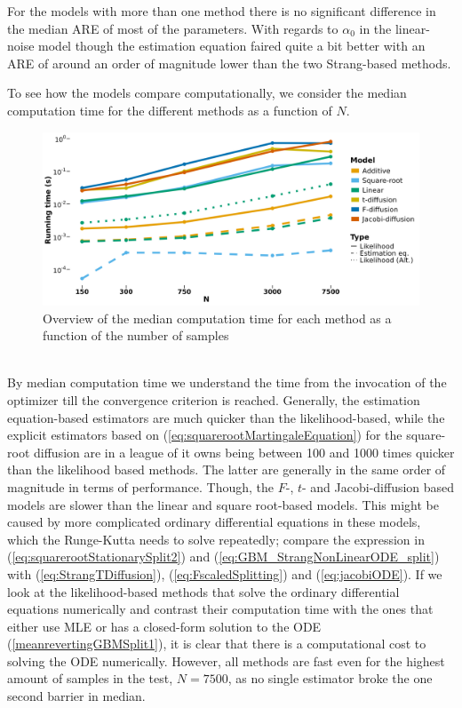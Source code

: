 For the models with more than one method there is no significant difference in the median ARE of most of the parameters. With regards to $\alpha_0$ in the linear-noise model though the estimation equation faired quite a bit better with an ARE of around an order of magnitude lower than the two Strang-based methods. 

\newpage \noindent To see how the models compare computationally, we consider the median computation time for the different methods as a function of $N$.
\begin{figure}[h]
    \begin{center}
    \includegraphics[scale = .1]{figures/estimation_duration_stationary.jpeg}
    \caption{Overview of the median computation time for each method as a function of the number of samples}
    \label{figure:overviewOfDurationStationary}
    \end{center}
\end{figure}\\
By median computation time we understand the time from the invocation of the optimizer till the convergence criterion is reached. Generally, the estimation equation-based estimators are much quicker than the likelihood-based, while the explicit estimators based on (\ref{eq:squarerootMartingaleEquation}) for the square-root diffusion are in a league of it owns being between 100 and 1000 times quicker than the likelihood based methods. The latter are generally in the same order of magnitude in terms of performance. Though, the $F$-, $t$- and Jacobi-diffusion based models are slower than the linear and square root-based models. This might be caused by more complicated ordinary differential equations in these models, which the Runge-Kutta needs to solve repeatedly; compare the expression in (\ref{eq:squarerootStationarySplit2}) and (\ref{eq:GBM_StrangNonLinearODE_split}) with (\ref{eq:StrangTDiffusion}), (\ref{eq:FscaledSplitting}) and (\ref{eq:jacobiODE}). If we look at the likelihood-based methods that solve the ordinary differential equations numerically and contrast their computation time with the ones that either use MLE or has a closed-form solution to the ODE (\ref{meanrevertingGBMSplit1}), it is clear that there is a computational cost to solving the ODE numerically. However, all methods are fast even for the highest amount of samples in the test, $N = 7500$, as no single estimator broke the one second barrier in median.
